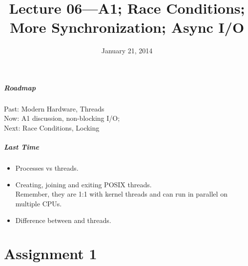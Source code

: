 \documentclass[aspectratio=43]{beamer}
\title{Lecture 06---A1; Race Conditions;\\ More Synchronization; Async I/O}
\date{January 21, 2014}
\newenvironment{changemargin}[1]{%
  \begin{list}{}{%
    \setlength{\topsep}{0pt}%
    \setlength{\leftmargin}{#1}%
    \setlength{\rightmargin}{1em}
    \setlength{\listparindent}{\parindent}%
    \setlength{\itemindent}{\parindent}%
    \setlength{\parsep}{\parskip}%
  }%
  \item[]}{\end{list}}
\begin{document}
\begin{frame}[plain]
  \titlepage
\end{frame}

\begin{frame}
  \frametitle{Roadmap}

  \Large
    \begin{changemargin}{2cm}
  Past: Modern Hardware, Threads \\[1em]

  Now: A1 discussion, non-blocking I/O;\\[1em]

  Next: Race Conditions, Locking
    \end{changemargin}
  
\end{frame}

\begin{frame}
  \frametitle{Last Time}

  \begin{changemargin}{2.5cm}
  \begin{itemize}
    \item Processes vs threads.
    \vfill
    \item Creating, joining and exiting POSIX threads.\\
       Remember, they are 1:1 with kernel threads and can run in parallel on
      multiple CPUs.
    \vfill
    \item Difference between  and  threads.
    \vfill
  \end{itemize}
  \end{changemargin}
\end{frame}

\part{Assignment 1}
\frame{\partpage}

\end{document}
